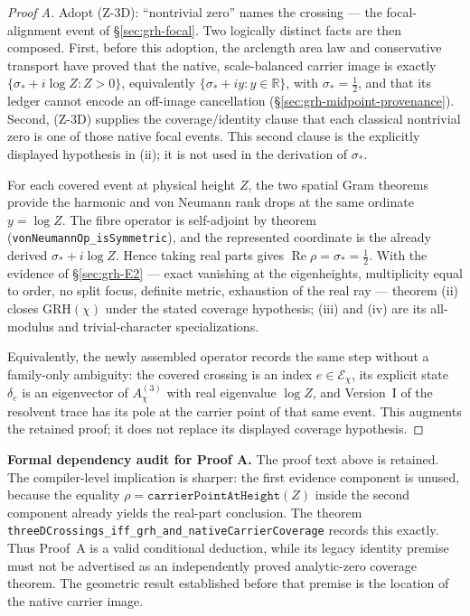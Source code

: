 \documentclass[11pt]{article}
\theoremstyle{definition}
\renewcommand{\Re}{\operatorname{Re}}
\begin{document}
\begin{proof}[Proof A]
Adopt (Z-3D): ``nontrivial zero'' names the crossing --- the focal-alignment
event of \S\ref{sec:grh-focal}.  Two logically distinct facts are then
composed.  First, before this adoption, the arclength area law and
conservative transport have proved that the native, scale-balanced carrier
image is exactly
\(\{\sigma_*+i\log Z:Z>0\}\), equivalently
\(\{\sigma_*+iy:y\in\mathbb R\}\), with
\(\sigma_*=\tfrac12\), and that its ledger cannot encode an off-image
cancellation (\S\ref{sec:grh-midpoint-provenance}).  Second, (Z-3D) supplies
the coverage/identity clause that each classical nontrivial zero is one of
those native focal events.  This second clause is the explicitly displayed
hypothesis in \textup{(ii)}; it is not used in the derivation of
\(\sigma_*\).

For each covered event at physical height \(Z\), the two spatial Gram
theorems provide the harmonic and von Neumann rank drops at the same
ordinate \(y=\log Z\).  The fibre operator is
self-adjoint by theorem
(\texttt{vonNeumannOp\_isSymmetric}), and the represented coordinate is the
already derived \(\sigma_*+i\log Z\).  Hence taking real parts gives
\(\Re\rho=\sigma_*=\tfrac12\).  With the evidence of
\S\ref{sec:grh-E2} --- exact vanishing at the eigenheights, multiplicity
equal to order, no split focus, definite metric, exhaustion of the real ray
--- theorem \textup{(ii)} closes \(\mathrm{GRH}(\chi)\) under the stated
coverage hypothesis; \textup{(iii)} and \textup{(iv)} are its all-modulus
and trivial-character specializations.

Equivalently, the newly assembled operator records the same step without a
family-only ambiguity: the covered crossing is an index
\(e\in\mathcal E_\chi\), its explicit state \(\delta_e\) is an eigenvector of
\(A^{(3)}_\chi\) with real eigenvalue \(\log Z\), and Version~I of the
resolvent trace has its pole at the carrier point of that same event.  This
augments the retained proof; it does not replace its displayed coverage
hypothesis.
\end{proof}

\medskip
\noindent\textbf{Formal dependency audit for Proof A.}  The proof text above
is retained.  The compiler-level implication is sharper: the first evidence
component is unused, because the equality
\(\rho=\texttt{carrierPointAtHeight}(Z)\) inside the second component already yields
the real-part conclusion.  The theorem
\texttt{threeDCrossings\_iff\_grh\_and\_nativeCarrierCoverage} records this
exactly.  Thus Proof~A is a valid conditional deduction, while its legacy
identity premise must not be advertised as an independently proved
analytic-zero coverage theorem.  The geometric result established before
that premise is the location of the native carrier image.
\end{document}
